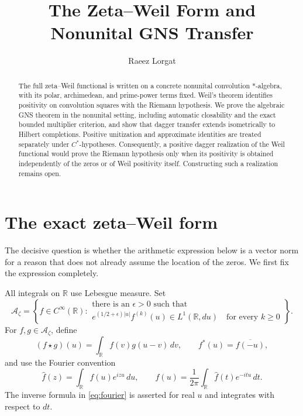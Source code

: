 \documentclass[11pt]{article}
\title{The Zeta--Weil Form and Nonunital GNS Transfer}
\author{Raeez Lorgat}
\date{}
\theoremstyle{definition}
\theoremstyle{remark}
\numberwithin{equation}{section}
\newcommand{\cA}{\mathcal A}
\newcommand{\R}{\mathbb R}
\begin{document}
\maketitle

\begin{abstract}
The full zeta--Weil functional is written on a concrete nonunital
convolution $*$-algebra, with its polar, archimedean, and prime-power
terms fixed.  Weil's theorem identifies positivity on convolution squares
with the Riemann hypothesis.  We prove the algebraic GNS theorem in the
nonunital setting, including automatic closability and the exact bounded
multiplier criterion, and show that dagger transfer extends isometrically
to Hilbert completions.  Positive unitization and approximate identities
are treated separately under $C^*$-hypotheses.  Consequently, a positive
dagger realization of the Weil functional would prove the Riemann
hypothesis only when its positivity is obtained independently of the
zeros or of Weil positivity itself.  Constructing such a realization
remains open.
\end{abstract}

\section{The exact zeta--Weil form}

The decisive question is whether the arithmetic expression below is a
vector norm for a reason that does not already assume the location of the
zeros.  We first fix the expression completely.

All integrals on $\R$ use Lebesgue measure.  Set
\[
 \cA_\zeta=
 \left\{f\in C^\infty(\R):
 \begin{array}{l}
 \text{there is an }\epsilon>0\text{ such that}\\
 e^{(1/2+\epsilon)|u|}f^{(k)}(u)\in L^1(\R,du)
 \quad\text{for every }k\geq0
 \end{array}
 \right\}.
\]
For $f,g\in\cA_\zeta$, define
\begin{equation}
 (f\star g)(u)=\int_{\R}f(v)g(u-v)\,dv,
 \qquad
 f^*(u)=\overline{f(-u)},
 \label{eq:conv}
\end{equation}
and use the Fourier convention
\begin{equation}
 \widehat f(z)=\int_{\R}f(u)e^{izu}\,du,
 \qquad
 f(u)=\frac1{2\pi}\int_{\R}\widehat f(t)e^{-itu}\,dt.
 \label{eq:fourier}
\end{equation}
The inverse formula in \eqref{eq:fourier} is asserted for real $u$ and
integrates with respect to $dt$.
\end{document}
